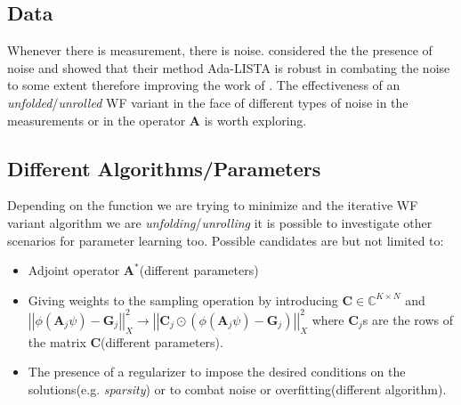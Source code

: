 \subsection*{Data}

Whenever there is measurement, there is noise. \cite{Aberdam2020} considered the the presence of noise and showed that 
their method \ac{Ada-LISTA} is robust in combating the noise to some extent therefore improving the work of \cite{Gregor2010}.
The effectiveness of an \emph{unfolded}/\emph{unrolled} \ac{WF} variant in the face of different types of noise in the measurements or in the operator $\boldsymbol{A}$ 
is worth exploring. 


\subsection*{Different Algorithms/Parameters}

Depending on the function we are trying to minimize and the iterative \ac{WF}\cite{Jaganathan2015}\cite{Liu2019} variant algorithm we are \emph{unfolding}/\emph{unrolling} 
it is possible to investigate other scenarios for parameter learning too. Possible candidates are but not limited to:
\begin{itemize}
  \item Adjoint operator $\boldsymbol{A}^*$(different parameters)
  \item Giving weights to the sampling operation by introducing $\boldsymbol{C}\in \mathbb{C}^{K\times N}$ and 
  $\left|\left|\phi(\boldsymbol{A}_j\psi)-\boldsymbol{G}_j\right|\right|_X^2 \rightarrow \left|\left|\boldsymbol{C}_j \odot \left(\phi(\boldsymbol{A}_j\psi)-\boldsymbol{G}_j\right)\right|\right|_X^2$ 
  where $\boldsymbol{C}_j$s are the rows of the matrix $\boldsymbol{C}$(different parameters).
  \item The presence of a regularizer to impose the desired conditions on the solutions(e.g. \emph{sparsity}) or to combat noise or overfitting(different algorithm).
\end{itemize}















